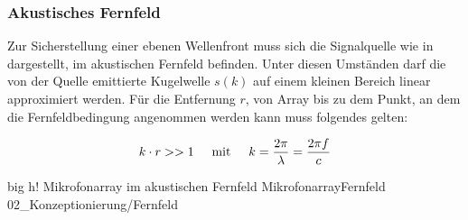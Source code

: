 \subsubsection{Akustisches Fernfeld}
\label{subsubsec:Fernfeld}
Zur Sicherstellung einer ebenen Wellenfront muss sich die Signalquelle wie in  dargestellt, im akustischen Fernfeld befinden. Unter diesen Umständen darf die von der Quelle emittierte Kugelwelle $s(k)$ auf einem kleinen Bereich linear approximiert werden. Für die Entfernung $r$, von Array bis zu dem Punkt, an dem die Fernfeldbedingung angenommen werden kann muss folgendes gelten\cite[S. 36f]{Book_Audio_Goerne}:

\begin{equation}
    k \cdot r >> 1 \hspace{0.5cm} \text{mit} \hspace{0.5cm} k = \frac{2 \pi}{\lambda} = \frac{2\pi f}{c}
\end{equation}


%
%


         {big}                 %
         {h!}             %
         {Mikrofonarray im akustischen Fernfeld}                %
         {MikrofonarrayFernfeld}                %
         {02_Konzeptionierung/Fernfeld}     %













